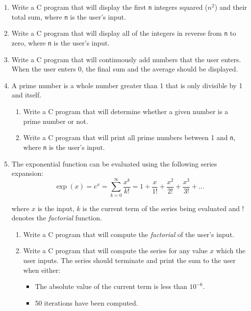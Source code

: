 \documentclass{pass}
\begin{document}
\begin{enumerate}[resume]
\item Write a C program that will display the first \texttt{n} integers squared ($n^2$) and their total sum, where \texttt{n} is the user's input. \\[12pt]

\item Write a C program that will display all of the integers in reverse from \texttt{n} to zero, where \texttt{n} is the user's input. \\[12pt]

\item Write a C program that will continuously add numbers that the user enters. When the user enters 0, the final sum and the average should be displayed. \\[12pt]

\item A prime number is a whole number greater than 1 that is only divisible by 1 and itself. \\[12pt]
	\begin{enumerate}
	\item Write a C program that will determine whether a given number is a prime number or not. \\[12pt]
	\item Write a C program that will print all prime numbers between 1 and \texttt{n}, where \texttt{n} is the user's input. \\[12pt]
	\end{enumerate}
	
\item The exponential function can be evaluated using the following series expansion:
\begin{equation*}
\exp(x) = e^x = \displaystyle\sum^\infty_{k=0}\dfrac{x^k}{k!} = 1 + \dfrac{x}{1!} + \dfrac{x^2}{2!} + \dfrac{x^3}{3!} + ...
\end{equation*}

where $x$ is the input, $k$ is the current term of the series being evaluated and $!$ denotes the \textit{factorial} function. \\[12pt]

	\begin{enumerate}
	\item Write a C program that will compute the \textit{factorial} of the user's input. \\[12pt]
	\item Write a C program that will compute the series for any value $x$ which the user inputs. The series should terminate and print the sum to the user when either:
\begin{itemize}
\item The absolute value of the current term is less than $10^{-6}$.
\item 50 iterations have been computed.
\end{itemize}
	
	\end{enumerate}




\end{enumerate}
\end{document}
